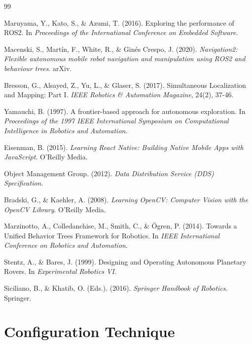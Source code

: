 \documentclass[12pt,a4paper,oneside]{report}
\begin{document}
\begin{thebibliography}{99}

 Maruyama, Y., Kato, S., \& Azumi, T. (2016). Exploring the performance of ROS2. In \textit{Proceedings of the International Conference on Embedded Software}.

 Macenski, S., Martín, F., White, R., \& Ginés Crespo, J. (2020). \textit{Navigation2: Flexible autonomous mobile robot navigation and manipulation using ROS2 and behaviour trees}. arXiv.

 Bresson, G., Alsayed, Z., Yu, L., \& Glaser, S. (2017). Simultaneous Localization and Mapping: Part I. \textit{IEEE Robotics \& Automation Magazine}, 24(2), 37-46.

 Yamauchi, B. (1997). A frontier-based approach for autonomous exploration. In \textit{Proceedings of the 1997 IEEE International Symposium on Computational Intelligence in Robotics and Automation}.

 Eisenman, B. (2015). \textit{Learning React Native: Building Native Mobile Apps with JavaScript}. O'Reilly Media.

 Object Management Group. (2012). \textit{Data Distribution Service (DDS) Specification}.

 Bradski, G., \& Kaehler, A. (2008). \textit{Learning OpenCV: Computer Vision with the OpenCV Library}. O'Reilly Media.

 Marzinotto, A., Colledanchise, M., Smith, C., \& Ögren, P. (2014). Towards a Unified Behavior Trees Framework for Robotics. In \textit{IEEE International Conference on Robotics and Automation}.

 Stentz, A., \& Bares, J. (1999). Designing and Operating Autonomous Planetary Rovers. In \textit{Experimental Robotics VI}.

 Siciliano, B., \& Khatib, O. (Eds.). (2016). \textit{Springer Handbook of Robotics}. Springer.

\end{thebibliography}

\newpage

\appendix

\chapter{Configuration Technique}
\end{document}
